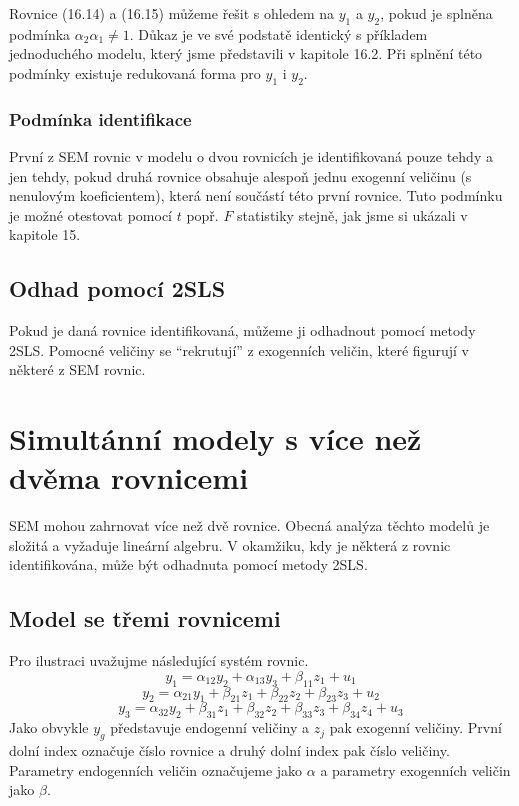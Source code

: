 Rovnice (16.14) a (16.15) můžeme řešit s ohledem na $y_1$ a $y_2$, pokud je splněna podmínka $\alpha_2 \alpha_1 \ne 1$. Důkaz je ve své podstatě identický s příkladem jednoduchého modelu, který jsme představili v kapitole 16.2. Při splnění této podmínky existuje redukovaná forma pro $y_1$ i $y_2$.

\subsubsection{Podmínka identifikace}

První z SEM rovnic v modelu o dvou rovnicích je identifikovaná pouze tehdy a jen tehdy, pokud druhá rovnice obsahuje alespoň jednu exogenní veličinu (s nenulovým koeficientem), která není součástí této první rovnice. Tuto podmínku je možné otestovat pomocí $t$ popř. $F$ statistiky stejně, jak jsme si ukázali v kapitole 15.

\subsection{Odhad pomocí 2SLS}

Pokud je daná rovnice identifikovaná, můžeme ji odhadnout pomocí metody 2SLS. Pomocné veličiny se ``rekrutují'' z exogenních veličin, které figurují v některé z SEM rovnic.

\section{Simultánní modely s více než dvěma rovnicemi}

SEM mohou zahrnovat více než dvě rovnice. Obecná analýza těchto modelů je složitá a vyžaduje lineární algebru. V okamžiku, kdy je některá z rovnic identifikována, může být odhadnuta pomocí metody 2SLS.

\subsection{Model se třemi rovnicemi}

Pro ilustraci uvažujme následující systém rovnic.
\begin{equation}
y_1 = \alpha_{12}y_2 + \alpha_{13}y_3 + \beta_{11}z_1 + u_1
\end{equation}
\begin{equation}
y_2 = \alpha_{21} y_1 + \beta_{21}z_1 + \beta_{22}z_2 + \beta_{23}z_3 + u_2
\end{equation}
\begin{equation}
y_3 = \alpha_{32} y_2 + \beta_{31}z_1 + \beta_{32}z_2 + \beta_{33}z_3 + \beta_{34}z_4 + u_3
\end{equation}
Jako obvykle $y_g$ představuje endogenní veličiny a $z_j$ pak exogenní veličiny. První dolní index označuje číslo rovnice a druhý dolní index pak číslo veličiny. Parametry endogenních veličin označujeme jako $\alpha$ a parametry exogenních veličin jako $\beta$.

